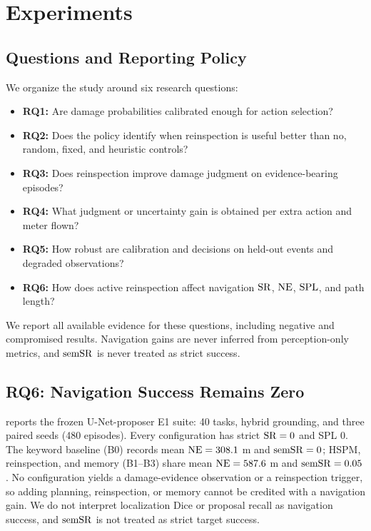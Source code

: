 \section{Experiments}
\label{sec:experiments}

\subsection{Questions and Reporting Policy}
We organize the study around six research questions:
\begin{itemize}
    \item \textbf{RQ1:} Are damage probabilities calibrated enough for action selection?
    \item \textbf{RQ2:} Does the policy identify when reinspection is useful better than no, random, fixed, and heuristic controls?
    \item \textbf{RQ3:} Does reinspection improve damage judgment on evidence-bearing episodes?
    \item \textbf{RQ4:} What judgment or uncertainty gain is obtained per extra action and meter flown?
    \item \textbf{RQ5:} How robust are calibration and decisions on held-out events and degraded observations?
    \item \textbf{RQ6:} How does active reinspection affect navigation \(\mathrm{SR}\), \(\mathrm{NE}\), \(\mathrm{SPL}\), and path length?
\end{itemize}
We report all available evidence for these questions, including negative and compromised results.
Navigation gains are never inferred from perception-only metrics, and \(\mathrm{semSR}\) is never treated as strict success.

\subsection{RQ6: Navigation Success Remains Zero}


 reports the frozen U-Net-proposer E1 suite:
40 tasks, hybrid grounding, and three paired seeds (480 episodes).
Every configuration has strict \(\mathrm{SR}=0\) and SPL \(0\).
The keyword baseline (B0) records mean \(\mathrm{NE}=308.1\) m and \(\mathrm{semSR}=0\);
HSPM, reinspection, and memory (B1--B3) share mean \(\mathrm{NE}=587.6\) m and
\(\mathrm{semSR}=0.05\).
No configuration yields a damage-evidence observation or a reinspection
trigger, so adding planning, reinspection, or memory cannot be credited with
a navigation gain.
We do not interpret localization Dice or proposal recall as navigation
success, and \(\mathrm{semSR}\) is not treated as strict target success.


